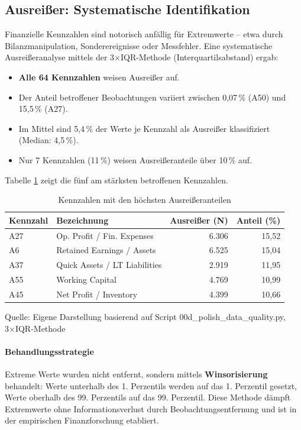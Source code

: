 \subsection{Ausreißer: Systematische Identifikation}

Finanzielle Kennzahlen sind notorisch anfällig für Extremwerte – etwa durch Bilanzmanipulation, Sonderereignisse oder Messfehler. Eine systematische Ausreißeranalyse mittels der 3×IQR-Methode (Interquartilsabstand) ergab:

\begin{itemize}[topsep=0.2\baselineskip]
    \item \textbf{Alle 64 Kennzahlen} weisen Ausreißer auf.
    \item Der Anteil betroffener Beobachtungen variiert zwischen 0,07\,\% (A50) und 15,5\,\% (A27).
    \item Im Mittel sind 5,4\,\% der Werte je Kennzahl als Ausreißer klassifiziert (Median: 4,5\,\%).
    \item Nur 7 Kennzahlen (11\,\%) weisen Ausreißeranteile über 10\,\% auf.
\end{itemize}

Tabelle \ref{tab:outliers} zeigt die fünf am stärksten betroffenen Kennzahlen.

\begin{table}[htbp]
\centering
\caption{Kennzahlen mit den höchsten Ausreißeranteilen}
\label{tab:outliers}
\begin{tabular}{llrr}
\toprule
\textbf{Kennzahl} & \textbf{Bezeichnung} & \textbf{Ausreißer (N)} & \textbf{Anteil (\%)} \\
\midrule
A27 & Op. Profit / Fin. Expenses & 6.306 & 15,52 \\
A6  & Retained Earnings / Assets & 6.525 & 15,04 \\
A37 & Quick Assets / LT Liabilities & 2.919 & 11,95 \\
A55 & Working Capital & 4.769 & 10,99 \\
A45 & Net Profit / Inventory & 4.399 & 10,66 \\
\bottomrule
\end{tabular}
\par\smallskip
{\footnotesize Quelle: Eigene Darstellung basierend auf Script 00d\_polish\_data\_quality.py, 3×IQR-Methode}
\end{table}

\paragraph{Behandlungsstrategie}
Extreme Werte wurden nicht entfernt, sondern mittels \textbf{Winsorisierung} behandelt: Werte unterhalb des 1. Perzentils werden auf das 1. Perzentil gesetzt, Werte oberhalb des 99. Perzentils auf das 99. Perzentil. Diese Methode dämpft Extremwerte ohne Informationsverlust durch Beobachtungsentfernung und ist in der empirischen Finanzforschung etabliert.

